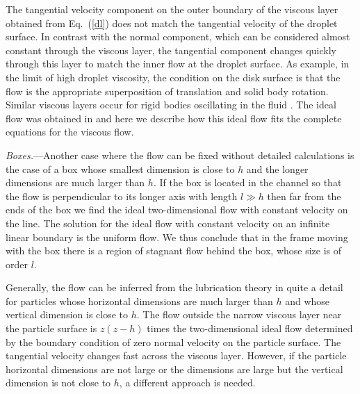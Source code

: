 The tangential velocity component on the outer boundary of the viscous layer obtained from Eq.~(\ref{dl}) does not match the tangential velocity of the droplet surface. In contrast with the normal component, which can be considered almost constant through the viscous layer, the tangential component changes quickly through this layer to match the inner flow at the droplet surface. As example, in the limit of high droplet viscosity, the condition on the disk surface is that the flow is the appropriate superposition of translation and solid body rotation. Similar viscous layers occur for rigid bodies oscillating in the fluid \citep{ll}. The ideal flow was obtained in \cite{tlusty} and here we describe how this ideal flow fits the complete equations for the viscous flow.

{\it Boxes.}---Another case where the flow can be fixed without detailed calculations is the case of a box whose smallest dimension is close to $h$ and the longer dimensions are much larger than $h$. If the box is located in the channel so that the flow is
perpendicular to its longer axis with length $l\gg h$ then far from the ends of the box we find the ideal two-dimensional flow with constant velocity on the line.
The solution for the ideal flow with constant velocity on an infinite linear boundary is the uniform flow. We thus conclude that in the frame moving with the box there is a region of stagnant flow behind the box, whose size is of order $l$.

Generally, the flow can be inferred from the lubrication theory in quite a detail for particles whose horizontal dimensions are much larger than $h$ and whose vertical dimension is close to $h$. The flow outside the narrow viscous layer near the particle surface is $z(z-h)$ times the two-dimensional ideal flow determined by the boundary condition of zero normal velocity on the particle surface. The tangential velocity changes fast across the viscous layer. However, if the particle horizontal dimensions are not large or the dimensions are large but the vertical dimension is not close to $h$, a different approach is needed.

